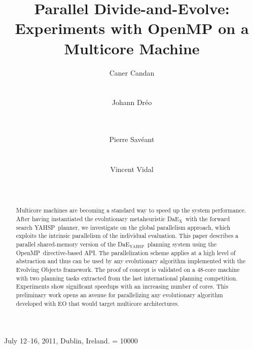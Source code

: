 \documentclass{sig-alternate}
\newcommand{\DAEX}{{\sc DaE$_{\text{X}}$}}
\newcommand{\DAEYAHSP}{{\sc DaE$_{\text{YAHSP}}$}}
\newcommand{\YAHSP}{{\sc YAHSP}}
\newcommand{\OPENMP}{{\sc OpenMP}}
\begin{document}
 {July 12--16, 2011, Dublin, Ireland.}
\widowpenalty = 10000

\title{Parallel Divide-and-Evolve:\\ Experiments with OpenMP on a Multicore Machine}


\author{
\alignauthor
Caner Candan\\
\\
\\
\alignauthor
Johann Dr{\'e}o\\
\\
\\
\and
\alignauthor
Pierre Sav{\'e}ant\\
\\
\\
\alignauthor
Vincent Vidal\\
\\
\\
}

\maketitle
\begin{abstract}
Multicore machines are becoming a standard way to speed up the system performance.
After having instantiated the evolutionary metaheuristic \DAEX\ with the forward search \YAHSP\ planner, 
we investigate on the global parallelism approach, which exploits the intrinsic parallelism of the individual evaluation.
This paper describes a parallel shared-memory version of the \DAEYAHSP\ planning system using the \OPENMP\ directive-based API.
The parallelization scheme applies at a high level of abstraction and thus can be used by any evolutionary algorithm implemented with the Evolving Objects framework.
The proof of concept is validated on a 48-core machine with two planning tasks extracted from the last international planning competition.
Experiments show significant speedups with an increasing number of cores.
This preliminary work opens an avenue for parallelizing any evolutionary algorithm developed with EO that would target multicore architectures.
\end{abstract}
\end{document}
